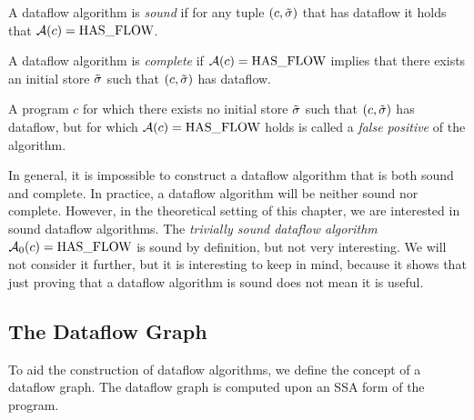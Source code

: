 \begin{definition}[Soundness]
    A dataflow algorithm is \emph{sound} if for any tuple $(c, \tilde{\sigma})$ that
    has dataflow it holds that $\operatorname{\mathcal{A}}(c) = \text{HAS\_FLOW}$.
\end{definition}

\begin{definition}[Completeness]
    A dataflow algorithm is \emph{complete} if $\operatorname{\mathcal{A}}(c) = \text{HAS\_FLOW}$
    implies that there exists an initial store $\tilde{\sigma}$
     such that $(c, \tilde{\sigma})$ has dataflow.
\end{definition}
\begin{definition}
    A program $c$ for which there exists no initial store $\tilde{\sigma}$ such that 
    $(c, \tilde{\sigma})$ has dataflow, but for which $\operatorname{\mathcal{A}}(c) = \text{HAS\_FLOW}$ holds
    is called a \emph{false positive} of the algorithm.
\end{definition}
\begin{remark}
    In general, it is impossible to construct a dataflow algorithm that is both 
    sound and complete.
    In practice, a dataflow algorithm will be neither sound nor complete.
    However, in the theoretical setting of this chapter, we are interested in 
    sound dataflow algorithms.
    The \emph{trivially sound dataflow algorithm} $\operatorname{\mathcal{A}}_0(c) = \text{HAS\_FLOW}$ 
    is sound by definition, but not very interesting.
    We will not consider it further, but it is interesting to keep in mind,
    because it shows that just proving that a dataflow algorithm is sound does not
    mean it is useful.    
\end{remark}

\subsection{The Dataflow Graph}
To aid the construction of dataflow algorithms, we define the concept
of a dataflow graph.
The dataflow graph is computed upon an SSA form of the program.

